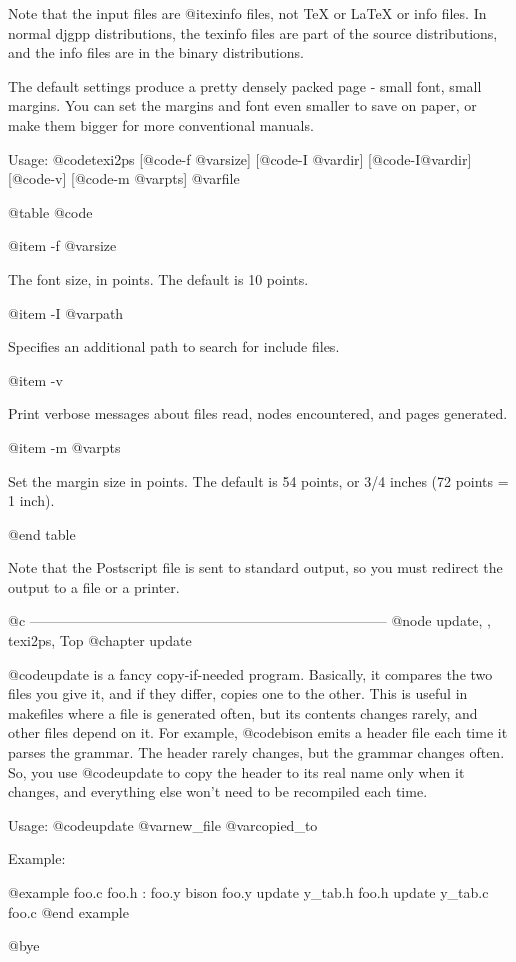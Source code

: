 Note that the input files are @i{texinfo} files, not TeX or LaTeX or
info files.  In normal djgpp distributions, the texinfo files are part
of the source distributions, and the info files are in the binary
distributions.

The default settings produce a pretty densely packed page - small font,
small margins.  You can set the margins and font even smaller to save on
paper, or make them bigger for more conventional manuals.

Usage: @code{texi2ps} [@code{-f} @var{size}] [@code{-I} @var{dir}]
[@code{-I}@var{dir}] [@code{-v}] [@code{-m} @var{pts}] @var{file}

@table @code

@item -f @var{size}

The font size, in points.  The default is 10 points.

@item -I @var{path}

Specifies an additional path to search for include files.

@item -v

Print verbose messages about files read, nodes encountered, and pages
generated.

@item -m @var{pts}

Set the margin size in points.  The default is 54 points, or 3/4 inches
(72 points = 1 inch).

@end table

Note that the Postscript file is sent to standard output, so you must
redirect the output to a file or a printer.

@c -----------------------------------------------------------------------------
@node update, , texi2ps, Top
@chapter update

@code{update} is a fancy copy-if-needed program.  Basically, it compares
the two files you give it, and if they differ, copies one to the other.
This is useful in makefiles where a file is generated often, but its
contents changes rarely, and other files depend on it.  For example,
@code{bison} emits a header file each time it parses the grammar.  The
header rarely changes, but the grammar changes often.  So, you use
@code{update} to copy the header to its real name only when it changes,
and everything else won't need to be recompiled each time.

Usage: @code{update} @var{new_file} @var{copied_to}

Example:

@example
foo.c foo.h : foo.y
        bison foo.y
        update y_tab.h foo.h
        update y_tab.c foo.c
@end example

@bye
